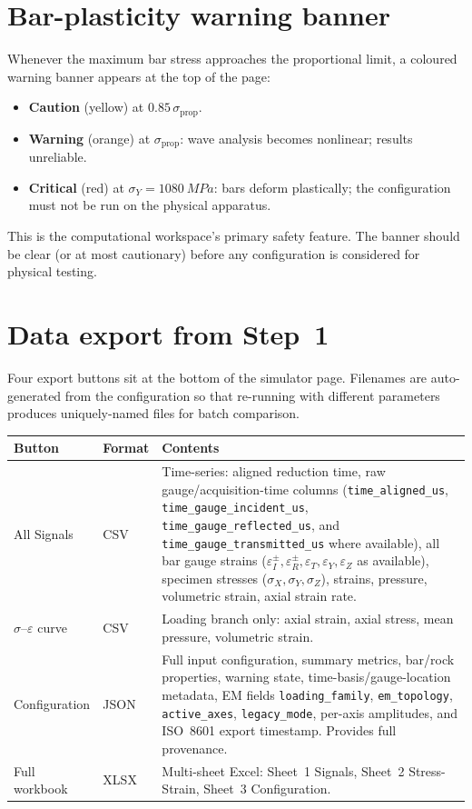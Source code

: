 \documentclass[11pt,a4paper,openany]{book}
\providecommand{\SI}[2]{\qty{#1}{#2}}
\theoremstyle{handbook}
\newcommand{\sig}{\sigma}
\newcommand{\eps}{\varepsilon}
\newcommand{\sigprop}{\sig_{\text{prop}}}
\begin{document}
\section{Bar-plasticity warning banner}

Whenever the maximum bar stress approaches the proportional limit, a
coloured warning banner appears at the top of the page:
\begin{itemize}[leftmargin=*,itemsep=2pt]
  \item \textcolor{warnorange}{\textbf{Caution}} (yellow) at
        $0.85\,\sigprop$.
  \item \textcolor{warnorange}{\textbf{Warning}} (orange) at $\sigprop$:
        wave analysis becomes nonlinear; results unreliable.
  \item \textcolor{dangerred}{\textbf{Critical}} (red) at
        $\sig_Y=\SI{1080}{MPa}$: bars deform plastically; the
        configuration must not be run on the physical apparatus.
\end{itemize}
This is the computational workspace's primary safety feature. The banner should be
clear (or at most cautionary) before any configuration is considered for
physical testing.

\section{Data export from Step~1}

Four export buttons sit at the bottom of the simulator page. Filenames are
auto-generated from the configuration so that re-running with different
parameters produces uniquely-named files for batch comparison.

\begin{center}
\renewcommand{\arraystretch}{1.4}
\small
\begin{tabular}{@{}p{3.4cm}p{2cm}p{8.5cm}@{}}
\toprule
\textbf{Button} & \textbf{Format} & \textbf{Contents} \\
\midrule
All Signals & CSV &
  Time-series: aligned reduction time, raw gauge/acquisition-time columns
  (\texttt{time\_aligned\_us}, \texttt{time\_gauge\_incident\_us},
  \texttt{time\_gauge\_reflected\_us}, and
  \texttt{time\_gauge\_transmitted\_us} where available), all bar gauge strains
  ($\eps_I^{\pm},\eps_R^{\pm},\eps_T,\eps_Y,\eps_Z$ as available),
  specimen stresses ($\sig_X,\sig_Y,\sig_Z$), strains, pressure,
  volumetric strain, axial strain rate. \\
$\sig$--$\eps$ curve & CSV &
  Loading branch only: axial strain, axial stress, mean pressure,
  volumetric strain. \\
Configuration & JSON &
  Full input configuration, summary metrics, bar/rock properties,
  warning state, time-basis/gauge-location metadata, EM fields
  \texttt{loading\_family}, \texttt{em\_topology}, \texttt{active\_axes},
  \texttt{legacy\_mode}, per-axis amplitudes, and ISO~8601 export
  timestamp. Provides full provenance. \\
Full workbook & XLSX &
  Multi-sheet Excel: Sheet~1 Signals, Sheet~2 Stress-Strain,
  Sheet~3 Configuration. \\
\bottomrule
\end{tabular}
\end{center}
\end{document}
